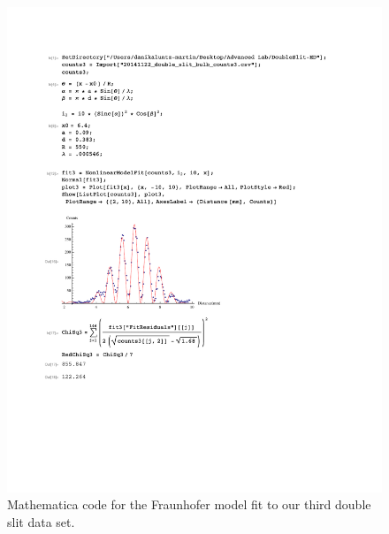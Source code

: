 \documentclass[prb,preprint]{revtex4-1}
\begin{document}
\begin{figure}[h!]
\centering
\includegraphics[width=6in]{DoubleSlitFraun3.pdf}
\caption{Mathematica code for the Fraunhofer model fit to our third double slit data set.}
\label{DoubleSlitFraun3}
\end{figure}
\end{document}
